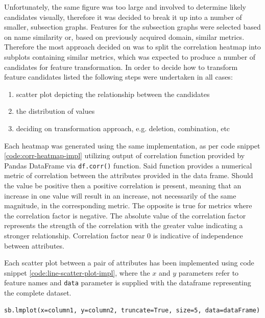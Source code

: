 Unfortunately, the same figure was too large and involved to determine likely candidates visually, therefore it was decided to break it up into a number of smaller, subsection graphs. Features for the subsection graphs were selected based on name similarity or, based on previously acquired domain, similar metrics.
Therefore the most approach decided on was to split the correlation heatmap into subplots containing similar metrics, which was expected to produce a number of candidates for feature transformation. In order to decide how to transform feature candidates listed the following steps were undertaken in all cases:
\begin{enumerate}
    \item scatter plot depicting the relationship between the candidates
    \item the distribution of values 
    \item deciding on transformation approach, e.g. deletion, combination, etc
\end{enumerate}

Each heatmap was generated using the same implementation, as per code snippet \ref{code:corr-heatmap-impl} utilizing output of correlation function provided by Pandas DataFrame via \texttt{df.corr()} function. Said function provides a numerical metric of correlation between the attributes provided in the data frame. Should the value be positive then a positive correlation is present, meaning that an increase in one value will result in an increase, not necessarily of the same magnitude, in the corresponding metric. The opposite is true for metrics where the correlation factor is negative. The absolute value of the correlation factor represents the strength of the correlation with the greater value indicating a stronger relationship. Correlation factor near 0 is indicative of independence between attributes.

Each scatter plot between a pair of attributes has been implemented using code snippet \ref{code:line-scatter-plot-impl}, where the $x$ and $y$ parameters refer to feature names and \texttt{data} parameter is supplied with the dataframe representing the complete dataset.

\begin{code}
\label{code:line-scatter-plot-impl}
\begin{verbatim}
sb.lmplot(x=column1, y=column2, truncate=True, size=5, data=dataFrame)
\end{verbatim}
\end{code}

